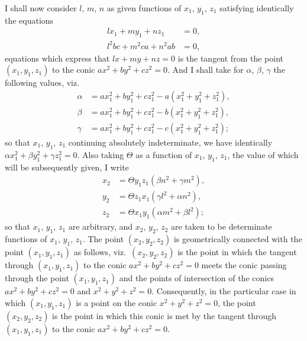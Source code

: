 \documentclass[11pt,a4paper]{article}
\begin{document}
I shall now consider $l$, $m$, $n$ as given functions of $x_1$, $y_1$, $z_1$ satisfying identically the equations
\begin{align*}
l x_1 + m y_1 + n z_1 &= 0,\\
l^2 bc + m^2 ca + n^2 ab &= 0,
\end{align*}
equations which express that $lx + my + nz = 0$ is the tangent from the point $(x_1, y_1, z_1)$ to the conic $ax^2 + by^2 + cz^2 = 0$. And I shall take for $\alpha$, $\beta$, $\gamma$ the following values, viz.
\begin{align*}
\alpha &= ax_1^2 + by_1^2 + cz_1^2 - a(x_1^2 + y_1^2 + z_1^2),\\
\beta &= ax_1^2 + by_1^2 + cz_1^2 - b(x_1^2 + y_1^2 + z_1^2),\\
\gamma &= ax_1^2 + by_1^2 + cz_1^2 - c(x_1^2 + y_1^2 + z_1^2);
\end{align*}
so that $x_1$, $y_1$, $z_1$ continuing absolutely indeterminate, we have identically $\alpha x_1^2 + \beta y_1^2 + \gamma z_1^2 = 0$. Also taking $\Theta$ as a function of $x_1$, $y_1$, $z_1$, the value of which will be subsequently given, I write
\begin{align*}
x_2 &= \Theta y_1 z_1 (\beta n^2 + \gamma m^2),\\
y_2 &= \Theta z_1 x_1 (\gamma l^2 + \alpha n^2),\\
z_2 &= \Theta x_1 y_1 (\alpha m^2 + \beta l^2);
\end{align*}
so that $x_1$, $y_1$, $z_1$ are arbitrary, and $x_2$, $y_2$, $z_2$ are taken to be determinate functions of $x_1$, $y_1$, $z_1$. The point $(x_2, y_2, z_2)$ is geometrically connected with the point $(x_1, y_1, z_1)$ as follows, viz.\ $(x_2, y_2, z_2)$ is the point in which the tangent through $(x_1, y_1, z_1)$ to the conic $ax^2 + by^2 + cz^2 = 0$ meets the conic passing through the point $(x_1, y_1, z_1)$ and the points of intersection of the conics $ax^2 + by^2 + cz^2 = 0$ and $x^2 + y^2 + z^2 = 0$. Consequently, in the particular case in which $(x_1, y_1, z_1)$ is a point on the conic $x^2 + y^2 + z^2 = 0$, the point $(x_2, y_2, z_2)$ is the point in which this conic is met by the tangent through $(x_1, y_1, z_1)$ to the conic $ax^2 + by^2 + cz^2 = 0$.

\medskip
\end{document}
